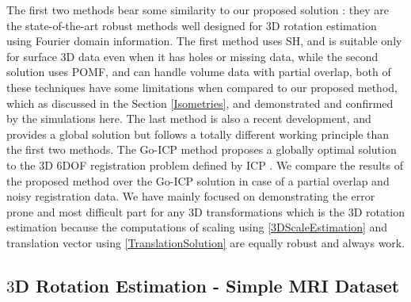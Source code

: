\documentclass{UCF_ETD}
\begin{document}
The first two methods bear some similarity to our proposed solution : they are the state-of-the-art robust methods well designed for $3$D rotation estimation using Fourier domain information. The first method uses SH, and is suitable only for surface $3$D data even when it has holes or missing data, while the second solution uses POMF, and can handle volume data with partial overlap, both of these techniques have some limitations when compared to our proposed method, which as discussed in the Section \ref{Isometries}, and demonstrated and confirmed by the simulations here. The last method is also a recent development, and provides a global solution but follows a totally different working principle than the first two methods. The Go-ICP method proposes a globally optimal solution to the $3$D $6$DOF registration problem defined by ICP \cite{McKay1992}. We compare the results of the proposed method over the Go-ICP solution in case of a partial overlap and noisy registration data. We have mainly focused on demonstrating the error prone and most difficult part for any $3$D transformations which is the $3$D rotation estimation because the computations of scaling using \eqref{3DScaleEstimation} and translation vector using \eqref{TranslationSolution} are equally robust and always work.

\subsection{$3$D Rotation Estimation - Simple MRI Dataset}\label{SimpleMRIExperiment}
\end{document}
